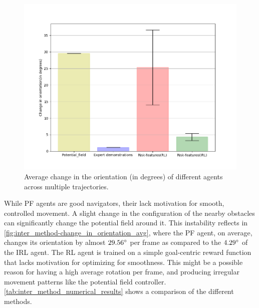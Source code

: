 \begin{figure}[htbp]
    \centering
    \includegraphics[width=0.7\linewidth]{plots/plot_without_outliers/ucy_inter_method_no_outlier/compute_trajectory_smoothness_ucy_no_outlier_inter_method.png}
    \caption{Average change in the orientation (in degrees) of different agents across multiple trajectories.}
    \label{fig:inter_method-change_in_orientation_avg}
\end{figure}
While PF agents are good navigators, their lack motivation for smooth, controlled movement. A slight change in the configuration of the nearby obstacles can significantly change the potential field around it. This instability reflects in  \autoref{fig:inter_method-change_in_orientation_avg}, where the PF agent, on average, changes its orientation by almost $29.56\degree$ per frame as compared to the $4.29\degree$ of the IRL agent. The RL agent is trained on a simple goal-centric reward function that lacks motivation for optimizing for smoothness. This might be a possible reason for having a high average rotation per frame, and producing irregular movement patterns like the potential field controller. \autoref{tab:inter_method_numerical_results} shows a comparison of the different methods.


